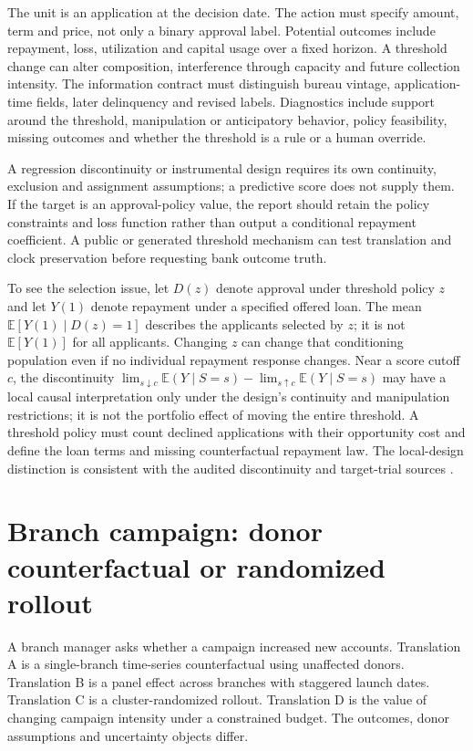 The unit is an application at the decision date. The action must specify amount, term and price, not only a binary approval label. Potential outcomes include repayment, loss, utilization and capital usage over a fixed horizon. A threshold change can alter composition, interference through capacity and future collection intensity. The information contract must distinguish bureau vintage, application-time fields, later delinquency and revised labels. Diagnostics include support around the threshold, manipulation or anticipatory behavior, policy feasibility, missing outcomes and whether the threshold is a rule or a human override.

A regression discontinuity or instrumental design requires its own continuity, exclusion and assignment assumptions; a predictive score does not supply them. If the target is an approval-policy value, the report should retain the policy constraints and loss function rather than output a conditional repayment coefficient. A public or generated threshold mechanism can test translation and clock preservation before requesting bank outcome truth.

To see the selection issue, let $D(z)$ denote approval under threshold policy $z$ and let $Y(1)$ denote repayment under a specified offered loan. The mean $\mathbb E[Y(1)\mid D(z)=1]$ describes the applicants selected by $z$; it is not $\mathbb E[Y(1)]$ for all applicants. Changing $z$ can change that conditioning population even if no individual repayment response changes. Near a score cutoff $c$, the discontinuity $\lim_{s\downarrow c}\mathbb E(Y\mid S=s)-\lim_{s\uparrow c}\mathbb E(Y\mid S=s)$ may have a local causal interpretation only under the design's continuity and manipulation restrictions; it is not the portfolio effect of moving the entire threshold. A threshold policy must count declined applications with their opportunity cost and define the loan terms and missing counterfactual repayment law. The local-design distinction is consistent with the audited discontinuity and target-trial sources \citep{hernan2020}.

\section{Branch campaign: donor counterfactual or randomized rollout}

A branch manager asks whether a campaign increased new accounts. Translation A is a single-branch time-series counterfactual using unaffected donors. Translation B is a panel effect across branches with staggered launch dates. Translation C is a cluster-randomized rollout. Translation D is the value of changing campaign intensity under a constrained budget. The outcomes, donor assumptions and uncertainty objects differ.

